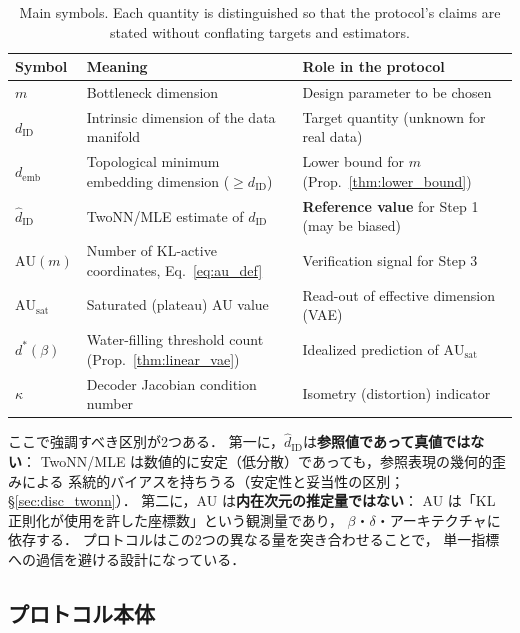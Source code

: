 \documentclass[11pt,a4paper]{jsarticle}
\newcommand{\dID}{d_{\mathrm{ID}}}
\newcommand{\hatdID}{\hat{d}_{\mathrm{ID}}}
\newcommand{\kap}{\kappa}
\newcommand{\AUsat}{\mathrm{AU}_{\mathrm{sat}}}
\newcommand{\demb}{d_{\mathrm{emb}}}
\newcommand{\dstar}{d^{*}(\beta)}
\begin{document}
\begin{table}[H]
\centering
\caption{Main symbols. Each quantity is distinguished so that the protocol's
claims are stated without conflating targets and estimators.}
\label{tab:notation}
\small
\begin{tabular}{lll}
\toprule
Symbol & Meaning & Role in the protocol \\
\midrule
$m$ & Bottleneck dimension & Design parameter to be chosen \\
$\dID$ & Intrinsic dimension of the data manifold & Target quantity (unknown for real data) \\
$\demb$ & Topological minimum embedding dimension ($\geq \dID$) & Lower bound for $m$ (Prop.~\ref{thm:lower_bound}) \\
$\hatdID$ & TwoNN/MLE estimate of $\dID$ & \textbf{Reference value} for Step 1 (may be biased) \\
$\mathrm{AU}(m)$ & Number of KL-active coordinates, Eq.~\eqref{eq:au_def} & Verification signal for Step 3 \\
$\AUsat$ & Saturated (plateau) AU value & Read-out of effective dimension (VAE) \\
$\dstar$ & Water-filling threshold count (Prop.~\ref{thm:linear_vae}) & Idealized prediction of $\AUsat$ \\
$\kap$ & Decoder Jacobian condition number & Isometry (distortion) indicator \\
\bottomrule
\end{tabular}
\end{table}

ここで強調すべき区別が2つある．
第一に，$\hatdID$は\textbf{参照値であって真値ではない}：
TwoNN/MLE は数値的に安定（低分散）であっても，参照表現の幾何的歪みによる
系統的バイアスを持ちうる（安定性と妥当性の区別；§\ref{sec:disc_twonn}）．
第二に，AU は\textbf{内在次元の推定量ではない}：
AU は「KL 正則化が使用を許した座標数」という観測量であり，
$\beta$・$\delta$・アーキテクチャに依存する．
プロトコルはこの2つの異なる量を突き合わせることで，
単一指標への過信を避ける設計になっている．

\subsection{プロトコル本体}\label{sec:protocol_main}
\end{document}
